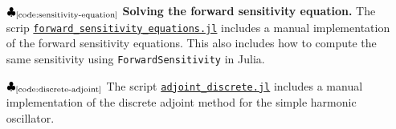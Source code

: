 \begin{itemize}
    \item[$\clubsuit_\text{\ref{code:sensitivity-equation}}$] \textbf{Solving the forward sensitivity equation. } The scrip \href{https://github.com/ODINN-SciML/DiffEqSensitivity-Review/blob/main/code/SolverMethods/Harmonic/forward_sensitivity_equations.jl}{\texttt{forward_sensitivity_equations.jl}} includes a manual implementation of the  forward sensitivity equations. This also includes how to compute the same sensitivity using \texttt{ForwardSensitivity} in Julia. 
    \item[$\clubsuit_\text{\ref{code:discrete-adjoint}}$] The script \href{https://github.com/ODINN-SciML/DiffEqSensitivity-Review/blob/main/code/SolverMethods/Harmonic/adjoint_discrete.jl}{\texttt{adjoint_discrete.jl}} includes a manual implementation of the discrete adjoint method for the simple harmonic oscillator. 
\end{itemize}